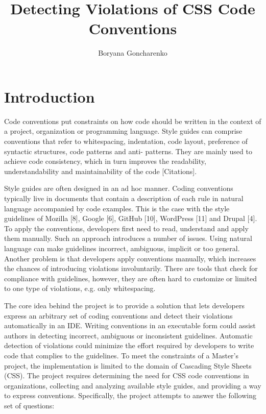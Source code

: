 \documentclass[parskip=full]{uvamscse}
\title{Detecting Violations of CSS Code Conventions}
\author{Boryana Goncharenko}
\begin{document}
\maketitle

\chapter{Introduction}

Code conventions put constraints on how code should be written in the context of a project,
organization or programming language. Style guides can comprise conventions that refer to
whitespacing, indentation, code layout, preference of syntactic structures, code patterns and anti-
patterns. They are mainly used to achieve code consistency, which in turn improves the readability,
understandability and maintainability of the code [Citations].

Style guides are often designed in an ad hoc manner. Coding conventions typically live in documents
that contain a description of each rule in natural language accompanied by code examples. This is
the case with the style guidelines of Mozilla [8], Google [6], GitHub [10], WordPress [11] and
Drupal [4]. To apply the conventions, developers first need to read, understand and apply them
manually. Such an approach introduces a number of issues. Using natural language can make guidelines
incorrect, ambiguous, implicit or too general. Another problem is that developers apply conventions
manually, which increases the chances of introducing violations involuntarily. There are tools that
check for compliance with guidelines, however, they are often hard to customize or limited to one
type of violations, e.g. only whitespacing.

The core idea behind the project is to provide a solution that lets developers express an arbitrary
set of coding conventions and detect their violations automatically in an IDE. Writing conventions
in an executable form could assist authors in detecting incorrect, ambiguous or inconsistent
guidelines. Automatic detection of violations could minimize the effort required by developers to
write code that complies to the guidelines. To meet the constraints of a Master’s project, the
implementation is limited to the domain of Cascading Style Sheets (CSS). The project requires
determining the need for CSS code conventions in organizations, collecting and analyzing available
style guides, and providing a way to express conventions. Specifically, the project attempts to
answer the following set of questions:
\end{document}
